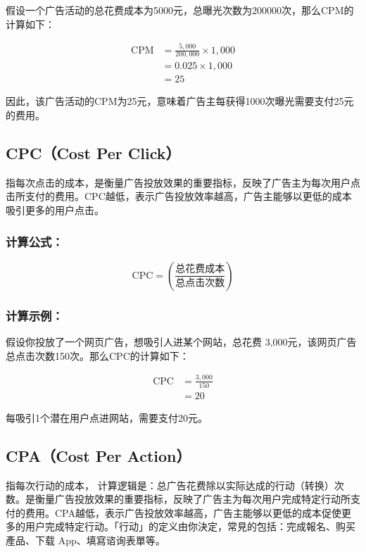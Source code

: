 \documentclass[
]{ctexart}
\begin{document}
假设一个广告活动的总花费成本为5000元，总曝光次数为200000次，那么CPM的计算如下：

\[
\begin{aligned}
\text{CPM} &= \frac{5,000}{200,000} \times 1,000 \\
           &= 0.025 \times 1,000 \\
           &= 25
\end{aligned}
\]

因此，该广告活动的CPM为25元，意味着广告主每获得1000次曝光需要支付25元的费用。

\subsection{CPC（Cost Per Click）}\label{cpccost-per-click}

指每次点击的成本，是衡量广告投放效果的重要指标，反映了广告主为每次用户点击所支付的费用。CPC越低，表示广告投放效率越高，广告主能够以更低的成本吸引更多的用户点击。

\subsubsection{计算公式：}\label{ux8ba1ux7b97ux516cux5f0f-1}

\[
\text{CPC} = \left( \frac{\text{总花费成本}}{\text{总点击次数}} \right) 
\]

\subsubsection{计算示例：}\label{ux8ba1ux7b97ux793aux4f8b-1}

假设你投放了一个网页广告，想吸引人进某个网站，总花费
3,000元，该网页广告总点击次数150次。那么CPC的计算如下：

\[
\begin{aligned}
\text{CPC} &= \frac{3,000}{150}  \\
           &= 20
\end{aligned}
\]

每吸引1个潜在用户点进网站，需要支付20元。

\subsection{CPA（Cost Per Action）}\label{cpacost-per-action}

指每次行动的成本，
计算逻辑是：总广告花费除以实际达成的行动（转换）次数。是衡量广告投放效果的重要指标，反映了广告主为每次用户完成特定行动所支付的费用。CPA越低，表示广告投放效率越高，广告主能够以更低的成本促使更多的用户完成特定行动。「行动」的定义由你決定，常見的包括：完成報名、购买產品、下载
App、填寫谘询表單等。
\end{document}
